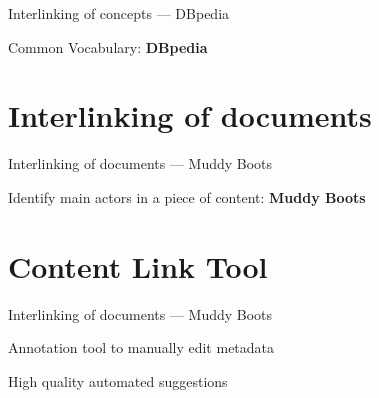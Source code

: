 \documentclass[10pt]{beamer}
\newcommand{\themename}{\textbf{\textsc{metropolis}}\xspace}
\begin{document}
\begin{frame}[fragile]{Interlinking of concepts — DBpedia}

  Common Vocabulary: {\textbf{DBpedia}}


\end{frame}


\section{Interlinking of documents}

\begin{frame}[fragile]{Interlinking of documents — Muddy Boots}

  Identify main actors in a piece of content: {\textbf{Muddy Boots}}


\end{frame}


\section{Content Link Tool}

\begin{frame}[fragile]{Interlinking of documents — Muddy Boots}

  Annotation tool to manually edit metadata

  High quality automated suggestions

\end{frame}










\end{document}
